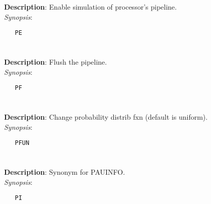 \section{\quad{}}
\label{manpages:PE}
\label{manpages:pe}
\vspace{-0.1in}
{\bf Description}: 	Enable simulation of processor's pipeline.\\[1.5ex]
{\em Synopsis}:
\vspace{-0.05in}
\scriptsize
\begin{lstlisting}
   PE   									
\end{lstlisting}
\normalsize
\vspace{-0.05in}


\section{\quad{}}
\label{manpages:PF}
\label{manpages:pf}
\vspace{-0.1in}
{\bf Description}: 	Flush the pipeline.\\[1.5ex]
{\em Synopsis}:
\vspace{-0.05in}
\scriptsize
\begin{lstlisting}
   PF   											
\end{lstlisting}
\normalsize
\vspace{-0.05in}


\section{\quad{}}
\label{manpages:PFUN}
\label{manpages:pfun}
\vspace{-0.1in}
{\bf Description}: 	Change probability distrib fxn (default is uniform).\\[1.5ex]
{\em Synopsis}:
\vspace{-0.05in}
\scriptsize
\begin{lstlisting}
   PFUN   							
\end{lstlisting}
\normalsize
\vspace{-0.05in}


\section{\quad{}}
\label{manpages:PI}
\label{manpages:pi}
\vspace{-0.1in}
{\bf Description}: 	Synonym for PAUINFO.\\[1.5ex]
{\em Synopsis}:
\vspace{-0.05in}
\scriptsize
\begin{lstlisting}
   PI   											
\end{lstlisting}
\normalsize
\vspace{-0.05in}


